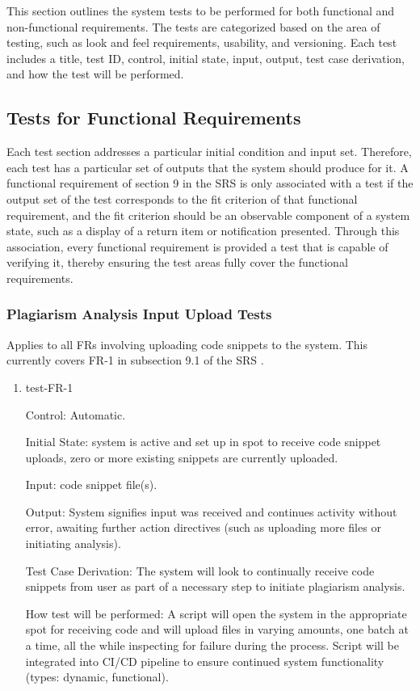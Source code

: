 \documentclass[12pt, titlepage]{article}
\begin{document}
This section outlines the system tests to be performed for both functional and non-functional requirements. 
The tests are categorized based on the area of testing, such as look and feel requirements, usability, and versioning. 
Each test includes a title, test ID, control, initial state, input, output, test case derivation, and how the test will be performed.

\subsection{Tests for Functional Requirements}

Each test section addresses a particular initial condition and input set. 
Therefore, each test has a particular set of outputs that the system should 
produce for it. A functional requirement of section 9 in the SRS \citep{SRS}
is only associated with a test if the output set of the test corresponds to 
the fit criterion of that functional requirement, and the fit criterion should 
be an observable component of a system state, such as a display of a return 
item or notification presented. Through this association, every functional 
requirement is provided a test that is capable of verifying it, thereby ensuring 
the test areas fully cover the functional requirements.

\subsubsection{Plagiarism Analysis Input Upload Tests}

Applies to all FRs involving uploading code snippets to the system. This currently 
covers FR-1 in subsection 9.1 of the SRS \citep{SRS}.

\begin{enumerate}

\item{test-FR-1\\}

Control: Automatic.
					
Initial State: system is active and set up in spot to receive code snippet 
uploads, zero or more existing snippets are currently uploaded.
					
Input: code snippet file(s).
					
Output: System signifies input was received and continues activity without 
error, awaiting further action directives (such as uploading more files or 
initiating analysis).

Test Case Derivation: The system will look to continually receive code 
snippets from user as part of a necessary step to initiate plagiarism analysis.
					
How test will be performed: A script will open the system in the appropriate spot for 
receiving code and will upload files in varying amounts, one batch at a time, all the 
while inspecting for failure during the process. Script will be integrated into CI/CD
pipeline to ensure continued system functionality (types: dynamic, functional).
					

\end{enumerate}
\end{document}
